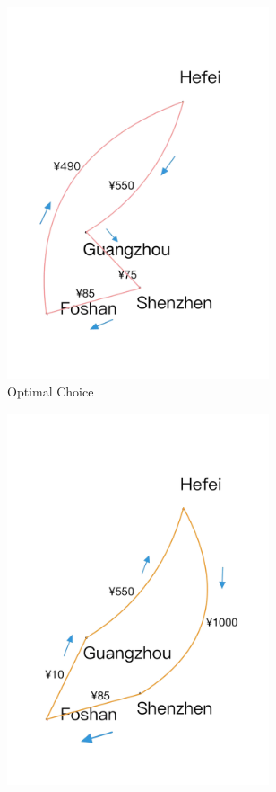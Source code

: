 \documentclass{article}
\begin{document}
\begin{figure}[!ht]
  \begin{subfigure}{0.3\textwidth}
    \includegraphics[width=0.85\textwidth]{pic/2.png}
    \caption{Optimal Choice}%
    \label{fig:your_image2}
  \end{subfigure}%
  \hfill %
  \begin{subfigure}{0.3\textwidth}
    \includegraphics[width=0.85\textwidth]{pic/3.png}

\end{subfigure}
\end{figure}
\end{document}
